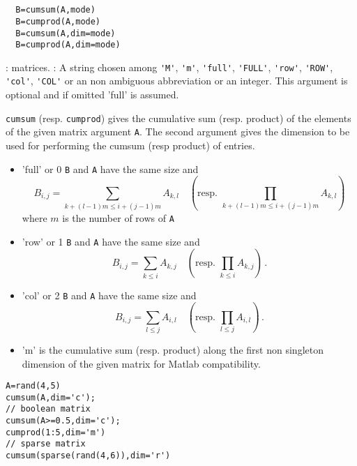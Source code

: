 \begin{mandesc}
  \\ %
  \\ %
\end{mandesc}
\begin{calling_sequence}
\begin{verbatim}
  B=cumsum(A,mode)  
  B=cumprod(A,mode)  
  B=cumsum(A,dim=mode) 
  B=cumprod(A,dim=mode)  
\end{verbatim}
\end{calling_sequence}
\begin{parameters}
  \begin{varlist}
    : matrices.
    : A string chosen among \verb+'M'+, \verb+'m'+, \verb+'full'+, \verb+'FULL'+, \verb+'row'+,
    \verb+'ROW'+, \verb+'col'+, \verb+'COL'+ or an non ambiguous abbreviation or an integer. 
    This argument is optional and if omitted 'full' is assumed.
  \end{varlist}
\end{parameters}
\begin{mandescription}
  \verb+cumsum+ (resp. \verb+cumprod+) gives the cumulative sum (resp. product) of the 
  elements of the given matrix argument \verb+A+. 
  The second argument gives the dimension to be used for performing the cumsum (resp product) of entries.       
  \begin{itemize}
    \item 'full' or 0 \verb+B+ and \verb+A+ have the same size and 
     $$B_{i,j} = \sum_{k+(l-1)m \le i+(j-1)m } A_{k,l} \quad \left( \text{resp. } \prod_{k+(l-1)m \le i+(j-1)m } A_{k,l} \right)$$ 
     where $m$ is the number of rows of \verb+A+
    \item 'row' or 1  \verb+B+ and \verb+A+ have the same size and 
     $$B_{i,j} = \sum_{k\le i} A_{k,j}\quad \left(\text{resp. }  \prod_{k\le i} A_{k,j}\right) \,. $$     
    \item 'col' or 2  \verb+B+ and \verb+A+ have the same size and 
         $$B_{i,j} = \sum_{l\le j} A_{i,l} \quad \left(\text{resp. }  \prod_{l\le j} A_{i,l}  \right) \,. $$     
    \item 'm' is the cumulative sum (resp. product) along the first non singleton dimension of the given matrix 
      for Matlab compatibility. 
  \end{itemize}
\end{mandescription}
\begin{examples}
\begin{Verbatim}
A=rand(4,5) 
cumsum(A,dim='c'); 
// boolean matrix 
cumsum(A>=0.5,dim='c');
cumprod(1:5,dim='m') 
// sparse matrix 
cumsum(sparse(rand(4,6)),dim='r')
\end{Verbatim}
\end{examples}
\begin{manseealso}
     
\end{manseealso}


